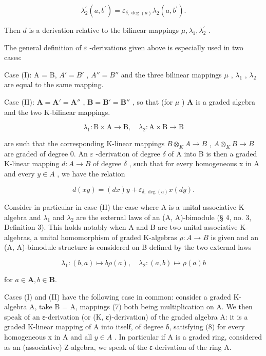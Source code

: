 \[
\lambda_ {2} ^ {\prime} (a, b ^ {\prime}) = \varepsilon_ {\delta , \deg (a)} \lambda_ {2} (a, b ^ {\prime}).
\]

Then \(d\) is a derivation relative to the bilinear mappings \(\mu, \lambda_{1}, \lambda_{2}^{\prime}\) .

The general definition of \(\varepsilon\) -derivations given above is especially used in two cases:

Case (I): A = B, \(A' = B'\) , \(A'' = B''\) and the three bilinear mappings \(\mu\) , \(\lambda_{1}\) , \(\lambda_{2}\) are equal to the same mapping.

Case (II): \(\mathbf{A} = \mathbf{A}' = \mathbf{A}''\) , \(\mathbf{B} = \mathbf{B}' = \mathbf{B}''\) , so that (for \(\mu\) ) \(\mathbf{A}\) is a graded algebra and the two K-bilinear mappings.

\[
\lambda_ {1} \colon \mathrm{B} \times \mathrm{A} \rightarrow \mathrm{B}, \quad \lambda_ {2} \colon \mathrm{A} \times \mathrm{B} \rightarrow \mathrm{B}\tag{7}
\]

are such that the corresponding K-linear mappings \(B \otimes_{K} A \to B\) , \(A \otimes_{K} B \to B\) are graded of degree 0. An \(\varepsilon\) -derivation of degree \(\delta\) of A into B is then a graded K-linear mapping \(d: A \to B\) of degree \(\delta\) , such that for every homogeneous x in A and every \(y \in A\) , we have the relation

\[
d (x y) = (d x) y + \varepsilon_ {\delta , \deg (a)} x (d y).\tag{8}
\]

Consider in particular in case (II) the case where A is a unital associative K-algebra and \(\lambda_{1}\) and \(\lambda_{2}\) are the external laws of an (A, A)-bimodule (§ 4, no. 3, Definition 3). This holds notably when A and B are two unital associative K-algebras, a unital homomorphism of graded K-algebras \(\rho: A \to B\) is given and an (A, A)-bimodule structure is considered on B defined by the two external laws

\[
\lambda_ {1} \colon (b, a) \mapsto b \rho (a), \quad \lambda_ {2} \colon (a, b) \mapsto \rho (a) b
\]

for \(a\in \mathbf{A},b\in \mathbf{B}.\)

Cases (I) and (II) have the following case in common: consider a graded K-algebra A, take B = A, mappings (7) both being multiplication on A. We then speak of an ε-derivation (or (K, ε)-derivation) of the graded algebra A: it is a graded K-linear mapping of A into itself, of degree δ, satisfying (8) for every homogeneous x in A and all \(y \in A\) . In particular if A is a graded ring, considered as an (associative) Z-algebra, we speak of the ε-derivation of the ring A.

